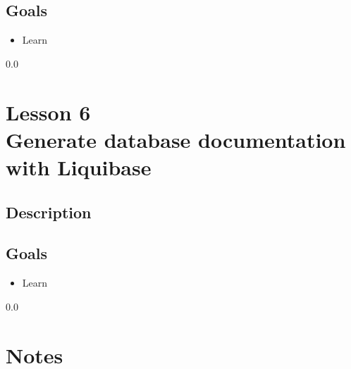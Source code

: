 \subsection*{Goals}
\begin{itemize}
  \item Learn
\end{itemize}

{\setlength{\baselineskip}%
  {0.0\baselineskip}
  \section*{\flushright Lesson 6\\
  Generate database documentation with Liquibase}
  \hrulefill \par}

\subsection*{Description}


\subsection*{Goals}
\begin{itemize}
  \item Learn
\end{itemize}

\newpage
  {\setlength{\baselineskip}%
           {0.0\baselineskip}
  \section*{Notes}
  \hrulefill \par}

